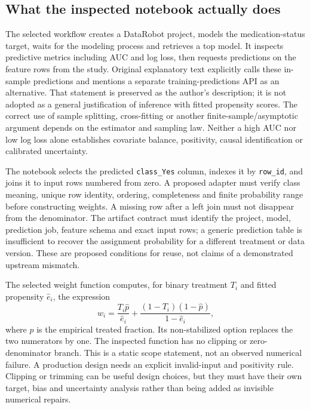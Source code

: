 \subsection{What the inspected notebook actually does}
The selected workflow creates a DataRobot project, models the medication-status
target, waits for the modeling process and retrieves a top model. It inspects
predictive metrics including AUC and log loss, then requests predictions on the
feature rows from the study. Original explanatory text explicitly calls these
in-sample predictions and mentions a separate training-predictions API as an
alternative. That statement is preserved as the author's description; it is
not adopted as a general justification of inference with fitted propensity
scores. The correct use of sample splitting, cross-fitting or another
finite-sample/asymptotic argument depends on the estimator and sampling law.
Neither a high AUC nor low log loss alone establishes covariate balance,
positivity, causal identification or calibrated uncertainty.~\citep{exec25_datarobot_notebook,exec25_datarobot_choice}

The notebook selects the predicted \texttt{class\_Yes} column, indexes it by
\texttt{row\_id}, and joins it to input rows numbered from zero. A proposed
adapter must verify class meaning, unique row identity, ordering, completeness
and finite probability range before constructing weights. A missing row after
a left join must not disappear from the denominator. The artifact contract
must identify the project, model, prediction job, feature schema and exact
input rows; a generic prediction table is insufficient to recover the
assignment probability for a different treatment or data version. These are
proposed conditions for reuse, not claims of a demonstrated upstream mismatch.
\citep{exec25_datarobot_notebook,exec25_datarobot_choice}

The selected weight function computes, for binary treatment $T_i$ and fitted
propensity $\widehat e_i$, the expression
\begin{equation}
 w_i=\frac{T_i\widehat p}{\widehat e_i}
       +\frac{(1-T_i)(1-\widehat p)}{1-\widehat e_i},
\end{equation}
where $\widehat p$ is the empirical treated fraction. Its non-stabilized option
replaces the two numerators by one. The inspected function has no clipping or
zero-denominator branch. This is a static scope statement, not an observed
numerical failure. A production design needs an explicit invalid-input and
positivity rule. Clipping or trimming can be useful design choices, but they
must have their own target, bias and uncertainty analysis rather than being
added as invisible numerical repairs.~\citep{exec25_datarobot_notebook,exec25_datarobot_choice}

